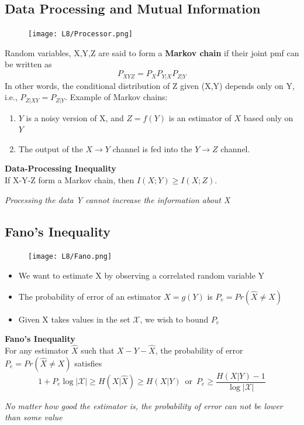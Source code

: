 \documentclass[12pt]{article}
\begin{document}
\subsection{Data Processing and Mutual Information}
\begin{figure}[H]
    \centering
    \texttt{[image: L8/Processor.png]}
\end{figure}
Random variables, X,Y,Z are said to form a \textcolor{blue1}{\textbf{Markov chain}} if their joint pmf can be written as 
\[
P_{XYZ} = P_XP_{Y|X}P_{Z|Y}
\]
In other words, the conditional distribution of Z given (X,Y) depends only on Y, i.e., $P_{Z|XY} = P_{Z|Y}$.
Example of Markov chains:
\begin{enumerate}
    \item $Y$ is a noisy version of X, and $Z= f(Y)$ is an estimator of $X$ based only on $Y$
    \item The output of the $X\rightarrow Y$ channel is fed into the $Y\rightarrow Z$ channel.
\end{enumerate}
{\textcolor{blue1}{\textbf{Data-Processing Inequality}}}\\
If X-Y-Z form a Markov chain, then $I(X;Y)\ge I(X;Z)$.
\begin{center}
    \textit{Processing the data Y cannot increase the information about X}
\end{center}
\subsection{Fano's Inequality}
\begin{figure}[H]
    \centering
    \texttt{[image: L8/Fano.png]}
\end{figure}
\begin{itemize}
    \item We want to estimate X by observing a correlated random variable Y
    \item The probability of error of an estimator $\hat{X}=g(Y)$ is $P_e=Pr(\hat{X}\not = X)$
    \item Given X takes values in the set $\mathcal{X}$, we wish to bound $P_e$
\end{itemize}
{\textcolor{blue1}{\textbf{Fano's Inequality}}}\\
For any estimator $\hat{X}$ such that $X-Y-\hat{X}$, the probability of error $P_e=Pr(\hat{X}\not = X)$ satisfies
\[
1 + P_e\log|\mathcal{X}| \ge H(X|\hat{X}) \ge H(X|Y) \, \textrm{  or  } \, P_e \ge \frac{H(X|Y)-1}{\log|\mathcal{X}|}
\]
\begin{center}
    \textit{No matter how good the estimator is, the probability of error can not be lower than some value}
\end{center}
\end{document}

